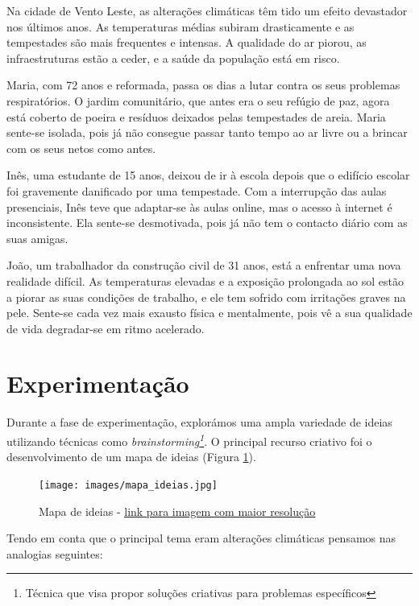 \documentclass[a4paper, 11pt, onecolumn, oneside]{report}
\begin{document}
Na cidade de Vento Leste, as alterações climáticas têm tido um efeito devastador nos últimos anos. As temperaturas médias subiram drasticamente e as tempestades são mais frequentes e intensas. A qualidade do ar piorou, as infraestruturas estão a ceder, e a saúde da população está em risco.
\par
Maria, com 72 anos e reformada, passa os dias a lutar contra os seus problemas respiratórios. O jardim comunitário, que antes era o seu refúgio de paz, agora está coberto de poeira e resíduos deixados pelas tempestades de areia. Maria sente-se isolada, pois já não consegue passar tanto tempo ao ar livre ou a brincar com os seus netos como antes.
\par
Inês, uma estudante de 15 anos, deixou de ir à escola depois que o edifício escolar foi gravemente danificado por uma tempestade. Com a interrupção das aulas presenciais, Inês teve que adaptar-se às aulas online, mas o acesso à internet é inconsistente. Ela sente-se desmotivada, pois já não tem o contacto diário com as suas amigas.
\par
João, um trabalhador da construção civil de 31 anos, está a enfrentar uma nova realidade difícil. As temperaturas elevadas e a exposição prolongada ao sol estão a piorar as suas condições de trabalho, e ele tem sofrido com irritações graves na pele. Sente-se cada vez mais exausto física e mentalmente, pois vê a sua qualidade de vida degradar-se em ritmo acelerado.

\section{Experimentação}
Durante a fase de experimentação, explorámos uma ampla variedade de ideias utilizando técnicas como \textit{brainstorming\footnote{Técnica que visa propor soluções criativas para problemas específicos}}. O principal recurso criativo foi o desenvolvimento de um mapa de ideias (Figura \ref{fig:mapa_ideias}).

\begin{figure}[ht]
    \centering
    \texttt{[image: images/mapa\_ideias.jpg]}
    \caption{Mapa de ideias - \href{https://imgur.com/a/ULVbBdO}{\underline{link para imagem com maior resolução}}}
    \label{fig:mapa_ideias}
\end{figure}

Tendo em conta que o principal tema eram alterações climáticas pensamos nas analogias seguintes:
\end{document}
